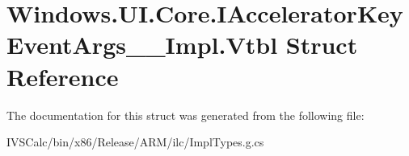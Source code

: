 \hypertarget{struct_windows_1_1_u_i_1_1_core_1_1_i_accelerator_key_event_args_____impl_1_1_vtbl}{}\section{Windows.\+U\+I.\+Core.\+I\+Accelerator\+Key\+Event\+Args\+\_\+\+\_\+\+Impl.\+Vtbl Struct Reference}
\label{struct_windows_1_1_u_i_1_1_core_1_1_i_accelerator_key_event_args_____impl_1_1_vtbl}


The documentation for this struct was generated from the following file\+:\begin{DoxyCompactItemize}
\item 
I\+V\+S\+Calc/bin/x86/\+Release/\+A\+R\+M/ilc/Impl\+Types.\+g.\+cs\end{DoxyCompactItemize}
